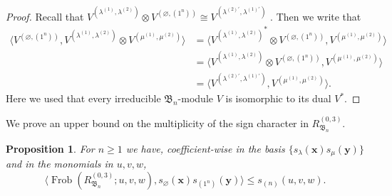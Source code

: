 \documentclass[12pt]{amsart}
\theoremstyle{plain}
\newtheorem{proposition}[theorem]{Proposition}
\theoremstyle{definition}
\DeclareMathOperator{\Frob}{Frob}
\newcommand{\x}{\mathbf{x}}
\newcommand{\y}{\mathbf{y}}
\begin{document}
\begin{proof}
    Recall that $V^{(\lambda^{(1)},\lambda^{(2)})} \otimes V^{(\varnothing,(1^n))} \cong V^{(\lambda^{(2)'},\lambda^{(1)'})}$ \cite[Theorem 5.5.6]{GeckPfeiffer}. Then we write that
    \begin{equation}\begin{aligned}
        \langle V^{(\varnothing,(1^n))} ,V^{(\lambda^{(1)},\lambda^{(2)})} \otimes V^{(\mu^{(1)},\mu^{(2)})} \rangle&= \langle {V^{(\lambda^{(1)},\lambda^{(2)})}}^* \otimes V^{(\varnothing,(1^n))} , V^{(\mu^{(1)},\mu^{(2)})} \rangle\\
        &= \langle {V^{(\lambda^{(1)},\lambda^{(2)})}} \otimes V^{(\varnothing,(1^n))} , V^{(\mu^{(1)},\mu^{(2)})} \rangle\\
        &= \langle {V^{(\lambda^{(2)'},\lambda^{(1)'})}}, V^{(\mu^{(1)},\mu^{(2)})} \rangle.
    \end{aligned}\end{equation}
    Here we used that every irreducible $\mathfrak{B}_n$-module $V$ is isomorphic to its dual $V^*$.
\end{proof}

We prove an upper bound on the multiplicity of the sign character in $R_{\mathfrak{B}_n}^{(0,3)}$.

\begin{proposition}\label{prop:upper-bound-03}
For $n \geq 1$ we have, coefficient-wise in the basis $\{s_\lambda(\x)s_\mu(\y)\}$ and in the monomials in $u,v,w$,    \begin{equation}
        \langle \Frob(R_{\mathfrak{B}_n}^{(0,3)};u,v,w),s_{\varnothing}(\x) s_{(1^n)}(\y) \rangle \leq s_{(n)}(u,v,w).
    \end{equation}
\end{proposition}
\end{document}
